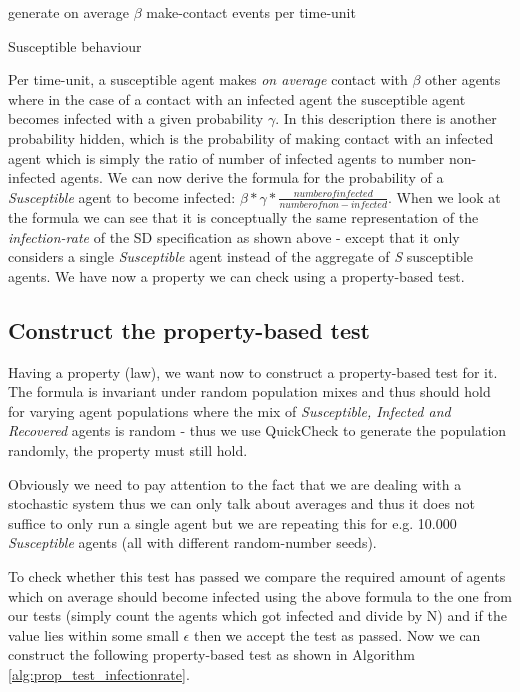 \begin{algorithm}
generate on average $\beta$ make-contact events per time-unit\; 
\caption{Susceptible behaviour}
\end{algorithm}

Per time-unit, a susceptible agent makes \textit{on average} contact with $\beta$ other agents where in the case of a contact with an infected agent the susceptible agent becomes infected with a given probability $\gamma$. In this description there is another probability hidden, which is the probability of making contact with an infected agent which is simply the ratio of number of infected agents to number non-infected agents. We can now derive the formula for the probability of a \textit{Susceptible} agent to become infected: $\beta * \gamma * \frac{number of infected}{number of non-infected}$. When we look at the formula we can see that it is conceptually the same representation of the \textit{infection-rate} of the SD specification as shown above - except that it only considers a single \textit{Susceptible} agent instead of the aggregate of \textit{S} susceptible agents. We have now a property we can check using a property-based test.

\subsection{Construct the property-based test}
Having a property (law), we want now to construct a property-based test for it. The formula is invariant under random population mixes and thus should hold for varying agent populations where the mix of \textit{Susceptible, Infected and Recovered} agents is random - thus we use QuickCheck to generate the population randomly, the property must still hold.

Obviously we need to pay attention to the fact that we are dealing with a stochastic system thus we can only talk about averages and thus it does not suffice to only run a single agent but we are repeating this for e.g. 10.000 \textit{Susceptible} agents (all with different random-number seeds). 

To check whether this test has passed we compare the required amount of agents which on average should become infected using the above formula to the one from our tests (simply count the agents which got infected and divide by N) and if the value lies within some small $\epsilon$ then we accept the test as passed. Now we can construct the following property-based test as shown in Algorithm \ref{alg:prop_test_infectionrate}.

